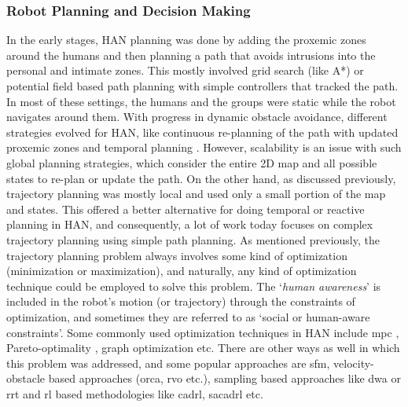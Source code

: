 
\subsubsection{Robot Planning and Decision Making}
In the early stages, HAN planning was done by adding the proxemic zones around the humans and then planning a path that avoids intrusions into the personal and intimate zones. This mostly involved grid search (like A*) or potential field based path planning with simple controllers that tracked the path. In most of these settings, the humans and the groups were static while the robot navigates around them. With progress in dynamic obstacle avoidance, different strategies evolved for HAN, like continuous re-planning of the path with updated proxemic zones \cite{truong2014dynamic} and temporal planning \cite{kollmitz2015time}. However, scalability is an issue with such global planning strategies, which consider the entire 2D map and all possible states to re-plan or update the path. On the other hand, as discussed previously, trajectory planning was mostly local and used only a small portion of the map and states. This offered a better alternative for doing temporal or reactive planning in HAN, and consequently, a lot of work today focuses on complex trajectory planning using simple path planning. As mentioned previously, the trajectory planning problem always involves some kind of optimization (minimization or maximization), and naturally, any kind of optimization technique could be employed to solve this problem. The `\textit{human awareness}' is included in the robot's motion (or trajectory) through the constraints of optimization, and sometimes they are referred to as `social or human-aware constraints'. Some commonly used optimization techniques in HAN include \acrshort{mpc} \cite{rosmann2021online}, Pareto-optimality \cite{forer2018socially}, graph optimization \cite{rosmann2013efficient} etc. There are other ways as well in which this problem was addressed, and some popular approaches are \acrshort{sfm}, velocity-obstacle based approaches (\acrshort{orca}, \acrshort{rvo} etc.), sampling based approaches like \acrshort{dwa} or \acrshort{rrt} and \acrshort{rl} based methodologies like \acrshort{cadrl}, \acrshort{sacadrl} etc.  

